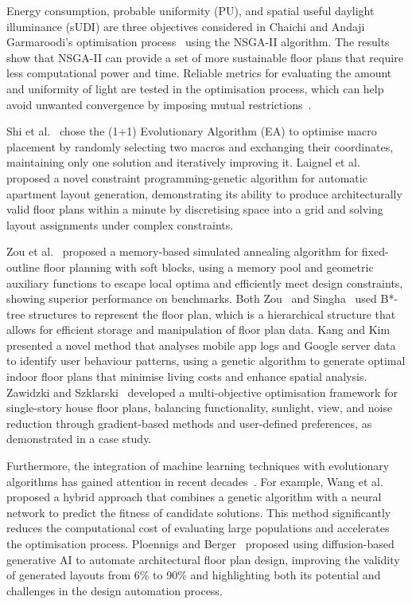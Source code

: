 \documentclass[]{article}
\begin{document}
Energy consumption, probable uniformity (PU), and spatial useful daylight illuminance (sUDI) are three objectives considered in Chaichi and Andaji Garmaroodi's optimisation process~\cite{CHAICHI2024108842} using the NSGA-II algorithm. The results show that NSGA-II can provide a set of more sustainable floor plans that require less computational power and time. Reliable metrics for evaluating the amount and uniformity of light are tested in the optimisation process, which can help avoid unwanted convergence by imposing mutual restrictions~\cite{CHAICHI2024108842}.

Shi et al.~\cite{10.5555/3666122.3666421} chose the (1+1) Evolutionary Algorithm (EA) to optimise macro placement by randomly selecting two macros and exchanging their coordinates, maintaining only one solution and iteratively improving it. Laignel et al.~\cite{LaignelGraziella2021Fpgt} proposed a novel constraint programming-genetic algorithm for automatic apartment layout generation, demonstrating its ability to produce architecturally valid floor plans within a minute by discretising space into a grid and solving layout assignments under complex constraints.

Zou et al.~\cite{ZouDexuan2024Amsa} proposed a memory-based simulated annealing algorithm for fixed-outline floor planning with soft blocks, using a memory pool and geometric auxiliary functions to escape local optima and efficiently meet design constraints, showing superior performance on benchmarks. Both Zou~\cite{ZouDexuan2024Amsa} and Singha~\cite{SinghaT.2012OoFu} used B*-tree structures to represent the floor plan, which is a hierarchical structure that allows for efficient storage and manipulation of floor plan data.
Kang and Kim~\cite{KangShinjin2022Fpof} presented a novel method that analyses mobile app logs and Google server data to identify user behaviour patterns, using a genetic algorithm to generate optimal indoor floor plans that minimise living costs and enhance spatial analysis.
Zawidzki and Szklarski~\cite{ZawidzkiMachi2020Moot} developed a multi-objective optimisation framework for single-story house floor plans, balancing functionality, sunlight, view, and noise reduction through gradient-based methods and user-defined preferences, as demonstrated in a case study.

Furthermore, the integration of machine learning techniques with evolutionary algorithms has gained attention in recent decades~\cite{HousseinEssamH.2021MAiP}. For example, Wang et al.~\cite{WANG20051329} proposed a hybrid approach that combines a genetic algorithm with a neural network to predict the fitness of candidate solutions. This method significantly reduces the computational cost of evaluating large populations and accelerates the optimisation process. Ploennigs and Berger~\cite{PloennigsJoern2024Acdw} proposed using diffusion-based generative AI to automate architectural floor plan design, improving the validity of generated layouts from 6\% to 90\% and highlighting both its potential and challenges in the design automation process.
\end{document}

